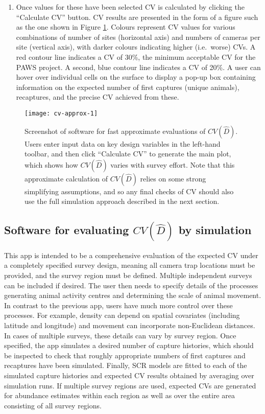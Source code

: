 \documentclass[a4paper,11pt, draft]{article} %
\begin{document}
\begin{enumerate}
\begin{enumerate}
\end{enumerate}
\item Once values for these have been selected CV is calculated by clicking the ``Calculate CV'' button. CV results are presented in the form of a figure such as the one shown in Figure \ref{cva-1}. Colours represent CV values for various combinations of number of sites (horizontal axis) and numbers of cameras per site (vertical axis), with darker colours indicating higher (i.e.\ worse) CVs. A red contour line indicates a CV of 30\%, the minimum acceptable CV for the PAWS project. A second, blue contour line indicates a CV of 20\%. A user can hover over individual cells on the surface to display a pop-up box containing information on the expected number of first captures (unique animals), recaptures, and the precise CV achieved from these.
\end{enumerate}

\begin{figure}[htbp]
\centering
\texttt{[image: cv-approx-1]}
\caption{Screenshot of software for fast approximate evaluations of $CV(\hat{D})$. Users enter input data on key design variables in the left-hand toolbar, and then click ``Calculate CV'' to generate the main plot, which shows how $CV(\hat{D})$ varies with survey effort. Note that this approximate calculation of $CV(\hat{D})$ relies on some strong simplifying assumptions, and so any final checks of CV should also use the full simulation approach described in the next section.}
\label{cva-1}
\end{figure} 

\subsection{Software for evaluating $CV(\hat{D})$ by simulation}
This app is intended to be a comprehensive evaluation of the expected CV under a completely specified survey design, meaning all camera trap locations must be provided, and the survey region must be defined. Multiple independent surveys can be included if desired. The user then needs to specify details of the processes generating animal activity centres and determining the scale of animal movement. In contrast to the previous app, users have much more control over these processes. For example, density can depend on spatial covariates (including latitude and longitude) and movement can incorporate non-Euclidean distances. In cases of multiple surveys, these details can vary by survey region. Once specified, the app simulates a desired number of capture histories, which should be inspected to check that roughly appropriate numbers of first captures and recaptures have been simulated. Finally, SCR models are fitted to each of the simulated capture histories and expected CV results obtained by averaging over simulation runs. If multiple survey regions are used, expected CVs are generated for abundance estimates within each region as well as over the entire area consisting of all survey regions.
\end{document}
